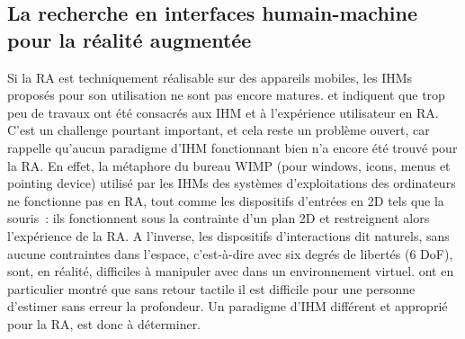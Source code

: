 \subsection*{La recherche en interfaces humain-machine pour la réalité augmentée}
Si la RA est techniquement réalisable sur des appareils mobiles, les IHMs proposés pour son utilisation ne sont pas encore matures. \citet{ZhouDuhBillinghurst2008} et \citet{DeSaChurchill2013} indiquent que trop peu de travaux ont été consacrés aux IHM et à l'expérience utilisateur en RA. C'est un challenge pourtant important, et cela reste un problème ouvert, car \citet{VanKrevelenPoelman2010} rappelle qu'aucun paradigme d'IHM fonctionnant bien n'a encore été trouvé pour la RA. En effet, la métaphore du bureau WIMP (pour \foreignlanguage{english}{windows}, \foreignlanguage{english}{icons}, \foreignlanguage{english}{menus} et \foreignlanguage{english}{pointing device}) utilisé par les IHMs des systèmes d'exploitations des ordinateurs ne fonctionne pas en RA, tout comme les dispositifs d'entrées en 2D tels que la souris~: ils fonctionnent sous la contrainte d'un plan 2D et restreignent alors l'expérience de la RA. \citep{VanKrevelenPoelman2010} A l'inverse, les dispositifs d'interactions dit naturels, sans aucune contraintes dans l'espace, c'est-à-dire avec six degrés de libertés (6 DoF), sont, en réalité, difficiles à manipuler avec dans un environnement virtuel. \citet{ChanKaoChenEtAl2010} ont en particulier montré que sans retour tactile il est difficile pour une personne d'estimer sans erreur la profondeur. Un paradigme d'IHM différent et approprié pour la RA, est donc à déterminer.

